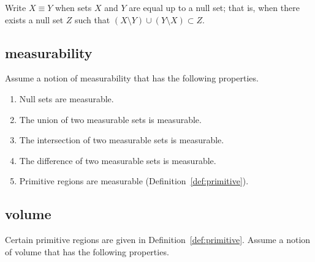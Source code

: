 Write $X\equiv Y$ when sets $X$ and $Y$ are equal up to a null set;
that is, when there exists a null set $Z$ such that
   $(X\setminus Y) \cup (Y\setminus X) \subset Z$.
%
%

\subsection{measurability}\label{sec:measure}
%

Assume a notion of measurability that has the following properties.

\begin{enumerate}%
 \item Null sets are measurable.
 \item The union of two measurable sets is measurable.
 \item The intersection of two measurable sets is measurable.
 \item The difference of two measurable sets is measurable.
 \item Primitive regions are measurable (Definition~\ref{def:primitive}).
%
%
\end{enumerate}

\subsection{volume}\label{sec:volume}

Certain primitive regions are given in Definition~\ref{def:primitive}.
Assume a notion of volume that has the following properties.
%

